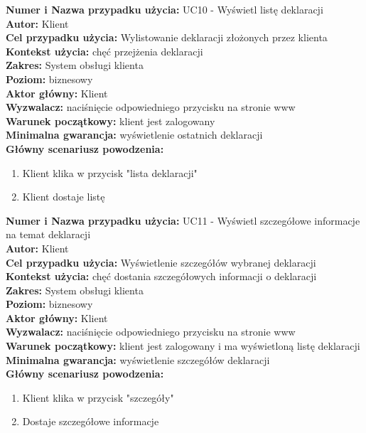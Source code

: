 \textbf{Numer i Nazwa przypadku użycia:} UC10 - Wyświetl listę deklaracji \\
\textbf{Autor:} Klient\\
\textbf{Cel przypadku użycia:} Wylistowanie deklaracji złożonych przez klienta \\
\textbf{Kontekst użycia:} chęć przejżenia deklaracji\\
\textbf{Zakres:} System obsługi klienta \\
\textbf{Poziom:} biznesowy \\
\textbf{Aktor główny:} Klient\\
\textbf{Wyzwalacz:} naciśnięcie odpowiedniego przycisku na stronie www \\
\textbf{Warunek początkowy:} klient jest zalogowany\\
\textbf{Minimalna gwarancja:} wyświetlenie ostatnich deklaracji\\
\textbf{Główny scenariusz powodzenia:} \\
	\begin{enumerate}
		\item Klient klika w przycisk "lista deklaracji"
		\item Klient dostaje listę
	\end{enumerate}
	
\textbf{Numer i Nazwa przypadku użycia:} UC11 - Wyświetl szczegółowe informacje na temat deklaracji \\
\textbf{Autor:} Klient\\
\textbf{Cel przypadku użycia:} Wyświetlenie szczegółów wybranej deklaracji \\
\textbf{Kontekst użycia:} chęć dostania szczegółowych informacji o deklaracji\\
\textbf{Zakres:} System obsługi klienta \\
\textbf{Poziom:} biznesowy \\
\textbf{Aktor główny:} Klient\\
\textbf{Wyzwalacz:} naciśnięcie odpowiedniego przycisku na stronie www \\
\textbf{Warunek początkowy:} klient jest zalogowany i ma wyświetloną listę deklaracji\\
\textbf{Minimalna gwarancja:} wyświetlenie szczegółów deklaracji \\
\textbf{Główny scenariusz powodzenia:} \\
	\begin{enumerate}
		\item Klient klika w przycisk "szczegóły"
		\item Dostaje szczegółowe informacje
	\end{enumerate}
	
